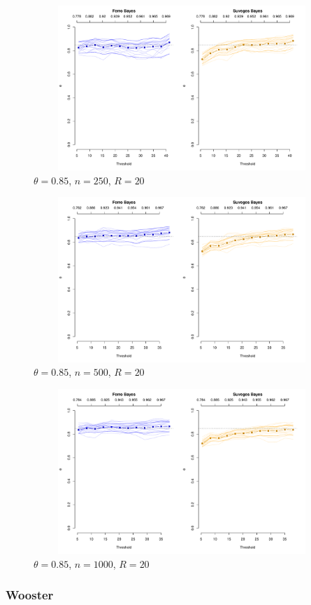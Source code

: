 \documentclass[12pt]{article}
\begin{document}
\newpage

\begin{figure}
\begin{center}
\includegraphics[width=5.5in, height=2.45in]{../extremal_comparison/figs/sim_frechet_hier_85_250_20.pdf}
\caption{$\theta=0.85$, $n=250$, $R=20$}
\end{center}
\end{figure}

\begin{figure}
\begin{center}
\includegraphics[width=5.5in, height=2.45in]{../extremal_comparison/figs/sim_frechet_hier_85_500_20.pdf}
\caption{$\theta=0.85$, $n=500$, $R=20$}
\end{center}
\end{figure}

\begin{figure}
\begin{center}
\includegraphics[width=5.5in, height=2.45in]{../extremal_comparison/figs/sim_frechet_hier_85_1000_20.pdf}
\caption{$\theta=0.85$, $n=1000$, $R=20$}
\end{center}
\end{figure}

\subsubsection*{Wooster}
\end{document}

